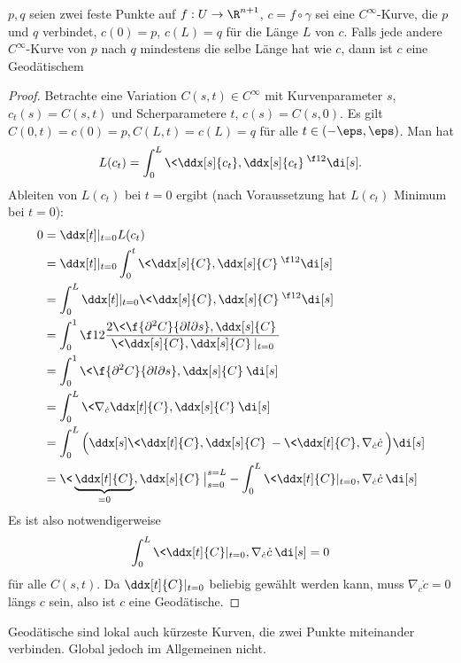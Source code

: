 \begin{st}
	$p, q$ seien zwei feste Punkte auf $f: U \to \R^{n+1}$, $c = f \circ \gamma$ sei eine $C^\infty$-Kurve, die $p$ und $q$ verbindet, $c(0) = p$, $c(L) = q$ für die Länge $L$ von $c$.
	Falls jede andere $C^\infty$-Kurve von $p$ nach $q$ mindestens die selbe Länge hat wie $c$, dann ist $c$ eine Geodätischem
	\begin{proof}
		Betrachte eine Variation $C(s,t) \in C^\infty$ mit Kurvenparameter $s$, $c_t(s) = C(s,t)$ und Scherparametere $t$, $c(s) = C(s, 0)$.
		Es gilt $C(0,t) = c(0) = p, C(L,t) = c(L) = q$ für alle $t \in (-\eps, \eps)$.
		Man hat
		\[
			L(c_t) = \int_0^L \< \ddx[s]{c_t}, \ddx[s]{c_t} \>^{\f 12} \di[s].
		\]
		Ableiten von $L(c_t)$ bei $t = 0$ ergibt (nach Voraussetzung hat $L(c_t)$ Minimum bei $t = 0$):
		\begin{align*}
			0
			&= \ddx[t]|_{t=0} L(c_t) \\
			&= \ddx[t]|_{t=0} \int_0^t \< \ddx[s]{C}, \ddx[s]{C} \>^{\f 12} \di[s] \\
			&= \int_0^L \ddx[t]|_{t=0} \< \ddx[s]{C}, \ddx[s]{C} \>^{\f 12} \di[s] \\
			&= \int_0^1 \f 12 \dfrac{2 \< \f{\partial^2 C}{\partial l \partial s}, \ddx[s]{C} \>}{\<\ddx[s]{C}, \ddx[s]{C}\>|_{t=0}} \\
			&= \int_0^1 \< \f{\partial^2 C}{\partial l \partial s}, \ddx[s]{C} \> \di[s] \\
			&= \int_0^L \< \nabla_{\dot c} \ddx[t]{C}, \ddx[s]{C} \> \di[s] \\
			&= \int_0^L \Big( \ddx[s] \< \ddx[t]{C}, \ddx[s]{C} \> - \< \ddx[t]{C}, \nabla_{\dot c}\dot c \> \Big) \di[s] \\
			&= \< \underbrace{\ddx[t]{C}}_{= 0}, \ddx[s]{C} \> \big|_{s=0}^{s=L} - \int_0^L \< \ddx[t]{C}|_{t=0}, \nabla_{\dot c}\dot c \> \di[s]
		\end{align*}
		Es ist also notwendigerweise
		\[
			\int_0^L \< \ddx[t]{C}|_{t=0}, \nabla_{\dot c}\dot c \> \di[s] = 0
		\]
		für alle $C(s,t)$.
		Da $\ddx[t]{C}|_{t=0}$ beliebig gewählt werden kann, muss $\nabla_{\dot c} \dot c = 0$ längs $c$ sein, also ist $c$ eine Geodätische.
	\end{proof}
	\begin{note}
		Geodätische sind lokal auch kürzeste Kurven, die zwei Punkte miteinander verbinden.
		Global jedoch im Allgemeinen nicht.
	\end{note}
\end{st}


